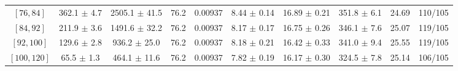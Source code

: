 \begin{tabular}{c||c|c|c|c|c|c|c||c|c}
$[76, 84]$ & 362.1 $\pm$ 4.7 & 2505.1 $\pm$ 41.5 & 76.2 & 0.00937 & 8.44 $\pm$ 0.14 & 16.89 $\pm$ 0.21 & 351.8 $\pm$ 6.1 & 24.69 & 110/105\\
$[84, 92]$ & 211.9 $\pm$ 3.6 & 1491.6 $\pm$ 32.2 & 76.2 & 0.00937 & 8.17 $\pm$ 0.17 & 16.75 $\pm$ 0.26 & 346.1 $\pm$ 7.6 & 25.07 & 119/105\\
$[92, 100]$ & 129.6 $\pm$ 2.8 & 936.2 $\pm$ 25.0 & 76.2 & 0.00937 & 8.18 $\pm$ 0.21 & 16.42 $\pm$ 0.33 & 341.0 $\pm$ 9.4 & 25.55 & 119/105\\
$[100, 120]$ & 65.5 $\pm$ 1.3 & 464.1 $\pm$ 11.6 & 76.2 & 0.00937 & 7.82 $\pm$ 0.19 & 16.17 $\pm$ 0.30 & 324.5 $\pm$ 7.8 & 25.14 & 106/105\\
\end{tabular}
